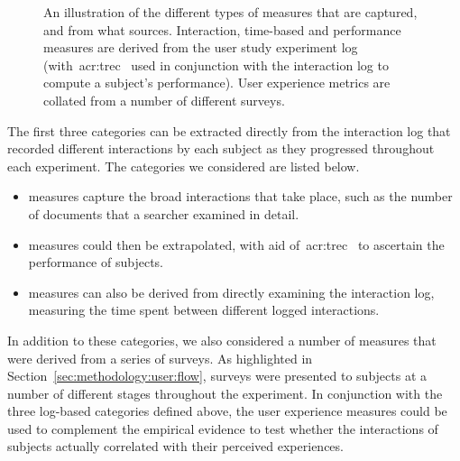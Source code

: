 \begin{figure}[t!]
    \centering
    \caption[Examples of evaluation measures]{An illustration of the different types of measures that are captured, and from what sources. Interaction, time-based and performance measures are derived from the user study experiment log (with~\gls{acr:trec}~ used in conjunction with the interaction log to compute a subject's performance). User experience metrics are collated from a number of different surveys.}
    \label{fig:evaluation_methodology}
\end{figure}

The first three categories can be extracted directly from the interaction log that recorded different interactions by each subject as they progressed throughout each experiment. The categories we considered are listed below.

\begin{itemize}
    
    \item{ measures capture the broad interactions that take place, such as the number of documents that a searcher examined in detail.}
    \item{ measures could then be extrapolated, with aid of~\gls{acr:trec}~ to ascertain the performance of subjects.}
    \item{ measures can also be derived from directly examining the interaction log, measuring the time spent between different logged interactions.}
    
\end{itemize}

In addition to these categories, we also considered a number of  measures that were derived from a series of surveys. As highlighted in Section~\ref{sec:methodology:user:flow}, surveys were presented to subjects at a number of different stages throughout the experiment. In conjunction with the three log-based categories defined above, the user experience measures could be used to complement the empirical evidence to test whether the interactions of subjects actually correlated with their perceived experiences.

